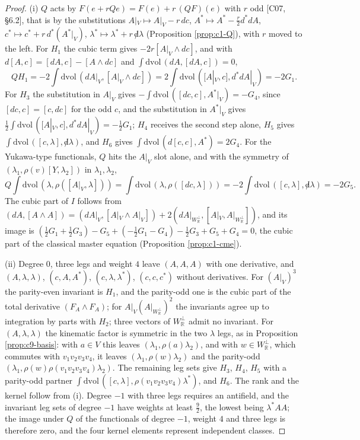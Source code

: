 \begin{proof}
(i) $Q$ acts by $F(e+rQe)=F(e)+r\,(QF)(e)$ with $r$ odd [C07, §6.2], that is by the substitutions $A|_V\mapsto A|_V-r\,dc$, $A^*\mapsto A^*-\tfrac r2d^*dA$, $c^*\mapsto c^*+r\,d^*(A^*|_V)$, $\lambda^*\mapsto\lambda^*+r\,{\not d}\lambda$ (Proposition \ref{prop:c1-Q}), with $r$ moved to the left. For $H_1$ the cubic term gives $-2r[A|_V\wedge dc]$, and with $d[A,c]=[dA,c]-[A\wedge dc]$ and $\int\mathrm{dvol}\,(dA,[dA,c])=0$,
\[
QH_1=-2\int\mathrm{dvol}\,(dA|_V,[A|_V\wedge dc])=2\int\mathrm{dvol}\,([A|_V,c],d^*dA|_V)=-2G_1 .
\]
For $H_3$ the substitution in $A|_V$ gives $-\int\mathrm{dvol}\,([dc,c],A^*|_V)=-G_4$, since $[dc,c]=[c,dc]$ for the odd $c$, and the substitution in $A^*|_V$ gives $\tfrac12\int\mathrm{dvol}\,([A|_V,c],d^*dA|_V)=-\tfrac12G_1$; $H_4$ receives the second step alone, $H_5$ gives $\int\mathrm{dvol}\,([c,\lambda],{\not d}\lambda)$, and $H_6$ gives $\int\mathrm{dvol}\,(d[c,c],A^*)=2G_4$. For the Yukawa-type functionals, $Q$ hits the $A|_V$ slot alone, and with the symmetry of $(\lambda_1,\rho(v)[Y,\lambda_2])$ in $\lambda_1,\lambda_2$,
\[
Q\int\mathrm{dvol}\,(\lambda,\rho([A|_V,\lambda]))=\int\mathrm{dvol}\,(\lambda,\rho([dc,\lambda]))=-2\int\mathrm{dvol}\,([c,\lambda],{\not d}\lambda)=-2G_5 .
\]
The cubic part of $I$ follows from $(dA,[A\wedge A])=(dA|_V,[A|_V\wedge A|_V])+2(dA|_{W_{\mathbb R}^\perp},[A|_V,A|_{W_{\mathbb R}^\perp}])$, and its image is $(\tfrac12G_1+\tfrac12G_3)-G_5+(-\tfrac12G_1-G_4)-\tfrac12G_3+G_5+G_4=0$, the cubic part of the classical master equation (Proposition \ref{prop:c1-cme}).

(ii) Degree $0$, three legs and weight $4$ leave $(A,A,A)$ with one derivative, and $(A,\lambda,\lambda)$, $(c,A,A^*)$, $(c,\lambda,\lambda^*)$, $(c,c,c^*)$ without derivatives. For $(A|_V)^3$ the parity-even invariant is $H_1$, and the parity-odd one is the cubic part of the total derivative $(F_A\wedge F_A)$; for $A|_V(A|_{W_{\mathbb R}^\perp})^2$ the invariants agree up to integration by parts with $H_2$; three vectors of $W_{\mathbb R}^\perp$ admit no invariant. For $(A,\lambda,\lambda)$ the kinematic factor is symmetric in the two $\lambda$ legs, as in Proposition \ref{prop:c9-basis}: with $a\in V$ this leaves $(\lambda_1,\rho(a)\lambda_2)$, and with $w\in W_{\mathbb R}^\perp$, which commutes with $v_1v_2v_3v_4$, it leaves $(\lambda_1,\rho(w)\lambda_2)$ and the parity-odd $(\lambda_1,\rho(w)\rho(v_1v_2v_3v_4)\lambda_2)$. The remaining leg sets give $H_3$, $H_4$, $H_5$ with a parity-odd partner $\int\mathrm{dvol}\,([c,\lambda],\rho(v_1v_2v_3v_4)\lambda^*)$, and $H_6$. The rank and the kernel follow from (i). Degree $-1$ with three legs requires an antifield, and the invariant leg sets of degree $-1$ have weights at least $\tfrac92$, the lowest being $\lambda^*AA$; the image under $Q$ of the functionals of degree $-1$, weight $4$ and three legs is therefore zero, and the four kernel elements represent independent classes.


\end{proof}
